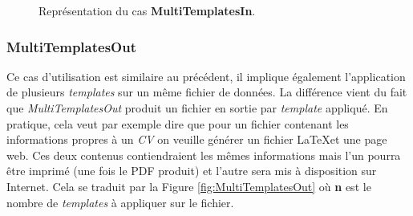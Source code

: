 				\begin{figure}
					\begin{center}
						\caption{Représentation du cas \textbf{MultiTemplatesIn}.}
						\label{fig:MultiTemplatesIn}
					\end{center}
				\end{figure}
				
			
			\subsubsection*{MultiTemplatesOut}
				Ce cas d'utilisation est similaire au précédent, il implique également l'application de plusieurs \textit{templates} sur un même fichier de données. La différence vient du fait que \textit{MultiTemplatesOut} produit un fichier en sortie par \textit{template} appliqué. En pratique, cela veut par exemple dire que pour un fichier contenant les informations propres à un \textit{CV} on veuille générer un fichier \LaTeX et une page web. Ces deux contenus contiendraient les mêmes informations mais l'un pourra être imprimé (une fois le PDF produit) et l'autre sera mis à disposition sur Internet. Cela se traduit par la Figure \ref{fig:MultiTemplatesOut} où \textbf{n} est le nombre de \textit{templates} à appliquer sur le fichier.
				
